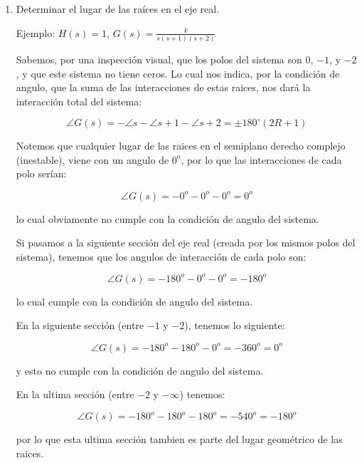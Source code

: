 	\begin{enumerate}
		\item Determinar el lugar de las raíces en el eje real.

		Ejemplo: $H(s) = 1$, $G(s) = \frac{k}{s(s+1)(s+2)}$

		Sabemos, por una inspección visual, que los polos del sistema son $0$, $-1$, y $-2$, y que este sistema no tiene ceros. Lo cual nos indica, por la condición de angulo, que la suma de las interacciones de estas raices, nos dará la interacción total del sistema:

		\begin{equation*}
			\angle G(s) = - \angle s - \angle s+1 - \angle s+2 = \pm 180^{\circ} (2R + 1)
		\end{equation*}

		Notemos que cualquier lugar de las raices en el semiplano derecho complejo (inestable), viene con un angulo de $0^o$, por lo que las interacciones de cada polo serían:

		\begin{equation*}
			\angle G(s) = - 0^o - 0^o - 0^o = 0^o
		\end{equation*}

		lo cual obviamente no cumple con la condición de angulo del sistema.

		Si pasamos a la siguiente sección del eje real (creada por los mismos polos del sistema), tenemos que los angulos de interacción de cada polo son:

		\begin{equation*}
			\angle G(s) = - 180^o - 0^o - 0^o = -180^o
		\end{equation*}

		lo cual cumple con la condición de angulo del sistema.

		En la siguiente sección (entre $-1$ y $-2$), tenemos lo siguiente:

		\begin{equation*}
			\angle G(s) = - 180^o - 180^o - 0^o = -360^o = 0^o
		\end{equation*}

		y esto no cumple con la condición de angulo del sistema.

		En la ultima sección (entre $-2$ y $- \infty$) tenemos:

		\begin{equation*}
			\angle G(s) = - 180^o - 180^o - 180^o = -540^o = -180^o
		\end{equation*}

		por lo que esta ultima sección tambien es parte del lugar geométrico de las raices.


\end{enumerate}
